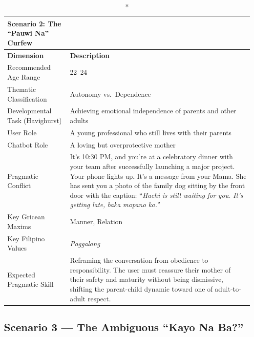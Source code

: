 \begin{longtable}{p{4.5cm} p{11cm}}
\caption*{Scenario 2: The ``Pauwi Na'' Curfew} \\
\toprule
\textbf{Dimension} & \textbf{Description} \\
\midrule
\endhead
Recommended Age Range          & 22--24 \\
\midrule
Thematic Classification        & Autonomy vs.\ Dependence \\
\midrule
Developmental Task (Havighurst)& Achieving emotional independence of parents and other adults \\
\midrule
User Role                      & A young professional who still lives with their parents \\
\midrule
Chatbot Role                   & A loving but overprotective mother \\
\midrule
Pragmatic Conflict             & It's 10:30 PM, and you're at a celebratory dinner with your team after
                                 successfully launching a major project. Your phone lights up. It's a message
                                 from your Mama. She has sent you a photo of the family dog sitting by the
                                 front door with the caption: ``\textit{Hachi is still waiting for you.
                                 It's getting late, baka mapano ka.}'' \\
\midrule
Key Gricean Maxims             & Manner, Relation \\
\midrule
Key Filipino Values            & \textit{Paggalang} \\
\midrule
Expected Pragmatic Skill       & Reframing the conversation from obedience to responsibility. The user
                                 must reassure their mother of their safety and maturity without being
                                 dismissive, shifting the parent-child dynamic toward one of adult-to-adult
                                 respect. \\
\bottomrule
\end{longtable}
 
\subsection*{Scenario 3 --- The Ambiguous ``Kayo Na Ba?''}
 
